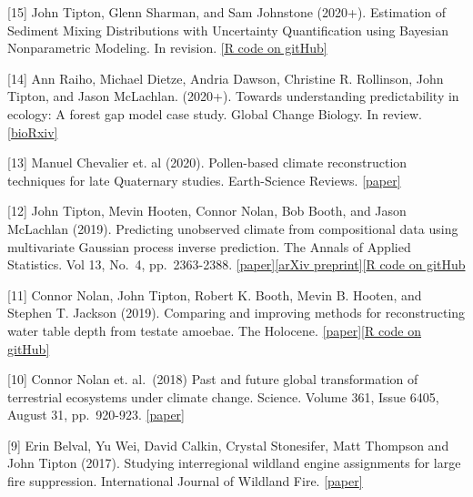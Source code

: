 \documentclass[11pt,]{article}
\renewenvironment{itemize}{
  \begin{list}{}{
    \setlength{\leftmargin}{1.5em}
  }
}{
  \end{list}
}
\begin{document}
\begin{itemize}
\item
  {[}15{]} John Tipton, Glenn Sharman, and Sam Johnstone (2020+).
  Estimation of Sediment Mixing Distributions with Uncertainty
  Quantification using Bayesian Nonparametric Modeling. In revision.
  \href{https://github.com/jtipton25/mixing-manuscript}{{[}R code on
  gitHub{]}}
\item
  {[}14{]} Ann Raiho, Michael Dietze, Andria Dawson, Christine R.
  Rollinson, John Tipton, and Jason McLachlan. (2020+). Towards
  understanding predictability in ecology: A forest gap model case
  study. Global Change Biology. In review.
  \href{https://www.biorxiv.org/content/10.1101/2020.05.05.079871v2.full.pdf}{{[}bioRxiv{]}}
\item
  {[}13{]} Manuel Chevalier et. al (2020). Pollen-based climate
  reconstruction techniques for late Quaternary studies. Earth-Science
  Reviews.
  \href{https://doi.org/10.1016/j.earscirev.2020.103384}{{[}paper{]}}
\item
  {[}12{]} John Tipton, Mevin Hooten, Connor Nolan, Bob Booth, and Jason
  McLachlan (2019). Predicting unobserved climate from compositional
  data using multivariate Gaussian process inverse prediction. The
  Annals of Applied Statistics. Vol 13, No.~4, pp.~2363-2388.
  \href{https://projecteuclid.org/euclid.aoas/1574910048}{{[}paper{]}}\href{https://arxiv.org/abs/1903.05036}{{[}arXiv
  preprint{]}}{[}\href{https://github.com/jtipton25/compositional-inverse-prediction}{R
  code on gitHub}
\item
  {[}11{]} Connor Nolan, John Tipton, Robert K. Booth, Mevin B. Hooten,
  and Stephen T. Jackson (2019). Comparing and improving methods for
  reconstructing water table depth from testate amoebae. The Holocene.
  \href{https://journals.sagepub.com/doi/10.1177/0959683619846969}{{[}paper{]}}\href{https://github.com/jtipton25/BayesComposition}{{[}R
  code on gitHub{]}}
\item
  {[}10{]} Connor Nolan et. al.~(2018) Past and future global
  transformation of terrestrial ecosystems under climate change.
  Science. Volume 361, Issue 6405, August 31, pp.~920-923.
  \href{http://science.sciencemag.org/content/361/6405/920}{{[}paper{]}}
\item
  {[}9{]} Erin Belval, Yu Wei, David Calkin, Crystal Stonesifer, Matt
  Thompson and John Tipton (2017). Studying interregional wildland
  engine assignments for large fire suppression. International Journal
  of Wildland Fire.
  \href{http://www.publish.csiro.au/WF/WF16162}{{[}paper{]}}

\end{itemize}
\end{document}
